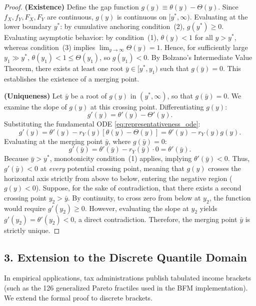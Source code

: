 \begin{proof}
\textbf{(Existence)} Define the gap function $g(y) \equiv \theta(y) - \Theta(y)$. Since $f_X, f_Y, F_X, F_Y$ are continuous, $g(y)$ is continuous on $[y^*, \infty)$.
Evaluating at the lower boundary $y^*$: by cumulative anchoring condition~(2), $g(y^*) \ge 0$.
Evaluating asymptotic behavior: by condition~(1), $\theta(y) < 1$ for all $y > y^*$, whereas condition~(3) implies $\lim_{y \to \infty} \Theta(y) = 1$. Hence, for sufficiently large $y_1 \gg y^*$, $\theta(y_1) < 1 \le \Theta(y_1)$, so $g(y_1) < 0$.
By Bolzano's Intermediate Value Theorem, there exists at least one root $\bar{y} \in [y^*, y_1)$ such that $g(\bar{y}) = 0$. This establishes the existence of a merging point.

\textbf{(Uniqueness)} Let $\bar{y}$ be a root of $g(y)$ in $(y^*, \infty)$, so that $g(\bar{y}) = 0$. We examine the slope of $g(y)$ at this crossing point. Differentiating $g(y)$:
\[
    g'(y) = \theta'(y) - \Theta'(y).
\]
Substituting the fundamental ODE \eqref{eq:representativeness_ode}:
\[
    g'(y) = \theta'(y) - r_Y(y)\left[\theta(y) - \Theta(y)\right] = \theta'(y) - r_Y(y) g(y).
\]
Evaluating at the merging point $\bar{y}$, where $g(\bar{y}) = 0$:
\[
    g'(\bar{y}) = \theta'(\bar{y}) - r_Y(\bar{y}) \cdot 0 = \theta'(\bar{y}).
\]
Because $\bar{y} > y^*$, monotonicity condition~(1) applies, implying $\theta'(\bar{y}) < 0$. Thus, $g'(\bar{y}) < 0$ at \textit{every} potential crossing point, meaning that $g(y)$ crosses the horizontal axis strictly from above to below, entering the negative region ($g(y) < 0$).
Suppose, for the sake of contradiction, that there exists a second crossing point $y_2 > \bar{y}$. By continuity, to cross zero from below at $y_2$, the function would require $g'(y_2) \ge 0$. However, evaluating the slope at $y_2$ yields $g'(y_2) = \theta'(y_2) < 0$, a direct contradiction. Therefore, the merging point $\bar{y}$ is strictly unique.
\end{proof}

\subsection*{3. Extension to the Discrete Quantile Domain}

In empirical applications, tax administrations publish tabulated income brackets (such as the 126 generalized Pareto fractiles used in the BFM implementation). We extend the formal proof to discrete brackets.

